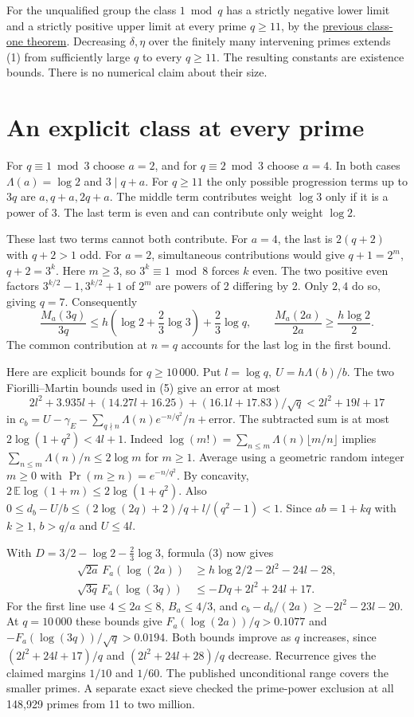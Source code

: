 \documentclass[11pt,a4paper]{article}
\newcommand{\head}[1]{\section*{\color{ink}#1}}
\begin{document}
For the unqualified group the class \(1\bmod q\) has a strictly negative lower
limit and a strictly positive upper limit at every prime \(q\ge11\), by the
\href{https://github.com/leecrossley/integrated-prime-errors-mod-11/blob/v2.0.0/range/PROOF.md}{previous class-one theorem}.
Decreasing \(\delta,\eta\) over the finitely many intervening primes extends (1)
from sufficiently large \(q\) to every \(q\ge11\). The resulting constants are
existence bounds. There is no numerical claim about their size.

\newpage
\head{An explicit class at every prime}
For \(q\equiv1\bmod3\) choose \(a=2\), and for \(q\equiv2\bmod3\) choose \(a=4\).
In both cases \(\Lambda(a)=\log2\) and \(3\mid q+a\). For \(q\ge11\) the
only possible progression terms up to \(3q\) are \(a,q+a,2q+a\).
The middle term contributes weight \(\log3\) only if it is a power of 3.
The last term is even and can contribute only weight \(\log2\).

These last two terms cannot both contribute. For \(a=4\), the last is
\(2(q+2)\) with \(q+2>1\) odd. For \(a=2\), simultaneous contributions would
give \(q+1=2^m\), \(q+2=3^k\). Here \(m\ge3\), so \(3^k\equiv1\bmod8\)
forces \(k\) even. The two positive even factors \(3^{k/2}-1,3^{k/2}+1\) of
\(2^m\) are powers of 2 differing by 2. Only \(2,4\) do so, giving \(q=7\).
Consequently
\[
 \frac{M_a(3q)}{3q}\le h\left(\log2+\frac23\log3\right)+\frac23\log q,
 \qquad \frac{M_a(2a)}{2a}\ge\frac{h\log2}{2}.
\]
The common contribution at \(n=q\) accounts for the last log in the first bound.

Here are explicit bounds for \(q\ge10\,000\). Put \(l=\log q,\ U=h\Lambda(b)/b\).
The two Fiorilli--Martin bounds used in (5) give an error at most
\[
 2l^2+3.935l+(14.27l+16.25)+(16.1l+17.83)/\sqrt q
 <2l^2+19l+17
\]
in \(c_b=U-\gamma_E-\sum_{q\nmid n}\Lambda(n)e^{-n/q^2}/n+\text{error}\).
The subtracted sum is at most \(2\log(1+q^2)<4l+1\). Indeed
\(\log(m!)=\sum_{n\le m}\Lambda(n)\lfloor m/n\rfloor\) implies
\(\sum_{n\le m}\Lambda(n)/n\le2\log m\) for \(m\ge1\).
Average using a geometric random integer \(m\ge0\) with
\(\Pr(m\ge n)=e^{-n/q^2}\). By concavity,
\(2\,\mathbb E\log(1+m)\le2\log(1+q^2)\).
Also \(0\le d_b-U/b\le(2\log(2q)+2)/q+l/(q^2-1)<1\). Since \(ab=1+kq\)
with \(k\ge1\), \(b>q/a\) and \(U\le4l\).

With \(D=3/2-\log2-\tfrac23\log3\), formula (3) now gives
\[
 \begin{aligned}
 \sqrt{2a}\,F_a(\log(2a))&\ge h\log2/2-2l^2-24l-28,\\
 \sqrt{3q}\,F_a(\log(3q))&\le-Dq+2l^2+24l+17 .
 \end{aligned}
\]
For the first line use \(4\le2a\le8\), \(B_a\le4/3\), and
\(c_b-d_b/(2a)\ge-2l^2-23l-20\).
At \(q=10\,000\) these bounds give \(F_a(\log(2a))/q>0.1077\) and
\(-F_a(\log(3q))/\sqrt q>0.0194\). Both bounds improve as \(q\) increases,
since \((2l^2+24l+17)/q\) and \((2l^2+24l+28)/q\) decrease.
Recurrence gives the claimed margins \(1/10\) and \(1/60\). The published
unconditional range covers the smaller primes. A separate exact sieve checked
the prime-power exclusion at all 148,929 primes from 11 to two million.
\end{document}
